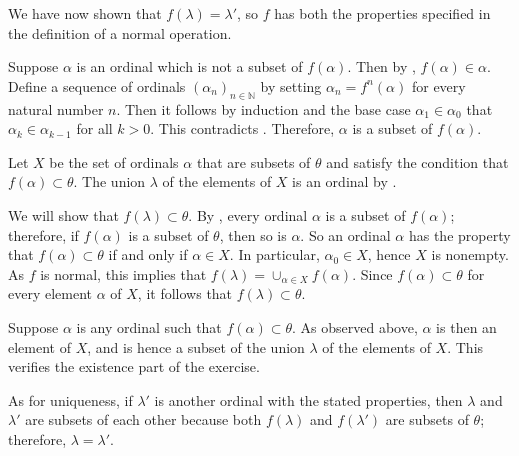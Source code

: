 \documentclass{article}
\begin{document}
\begin{solution}[\ref{exe:1npoplek}]
  We have now shown that \(f(\lambda) = \lambda'\), so \(f\) has both
  the properties specified in the definition of a normal operation.
\end{solution}

\begin{solution}[\ref{exe:fxx1l9m4}]
  \label{sol:aguyl256}
  Suppose \(\alpha\) is an ordinal which is not a subset of
  \(f(\alpha)\).  Then by ,
  \(f(\alpha) \in \alpha\).  Define a sequence of ordinals
  \((\alpha_n)_{n \in \mathbb{N}}\) by setting
  \(\alpha_n = f^n(\alpha)\) for every natural number \(n\).  Then it
  follows by induction and the base case \(\alpha_1 \in \alpha_0\)
  that \(\alpha_k \in \alpha_{k-1}\) for all \(k > 0\).  This
  contradicts .  Therefore, \(\alpha\) is a subset
  of \(f(\alpha)\).
\end{solution}

\begin{solution}[\ref{exe:pf75g5kz}]
  \label{sol:zfegv2x7}
  Let \(X\) be the set of ordinals \(\alpha\) that are subsets of
  \(\theta\) and satisfy the condition that
  \(f(\alpha) \subset \theta\).  The union \(\lambda\) of the elements
  of \(X\) is an ordinal by .

  We will show that \(f(\lambda) \subset \theta\).  By
  , every ordinal \(\alpha\) is a subset of
  \(f(\alpha)\); therefore, if \(f(\alpha)\) is a subset of
  \(\theta\), then so is \(\alpha\).  So an ordinal \(\alpha\) has the
  property that \(f(\alpha) \subset \theta\) if and only if
  \(\alpha \in X\).  In particular, \(\alpha_0 \in X\), hence \(X\) is
  nonempty.  As \(f\) is normal, this implies that
  \(f(\lambda) = \cup_{\alpha \in X}f(\alpha)\).  Since
  \(f(\alpha) \subset \theta\) for every element \(\alpha\) of \(X\),
  it follows that \(f(\lambda) \subset \theta\).

  Suppose \(\alpha\) is any ordinal such that
  \(f(\alpha) \subset \theta\).  As observed above, \(\alpha\) is then
  an element of \(X\), and is hence a subset of the union \(\lambda\)
  of the elements of \(X\).  This verifies the existence part of the
  exercise.

  As for uniqueness, if \(\lambda'\) is another ordinal with the
  stated properties, then \(\lambda\) and \(\lambda'\) are subsets of
  each other because both \(f(\lambda)\) and \(f(\lambda')\) are
  subsets of \(\theta\); therefore, \(\lambda = \lambda'\).
\end{solution}
\end{document}
